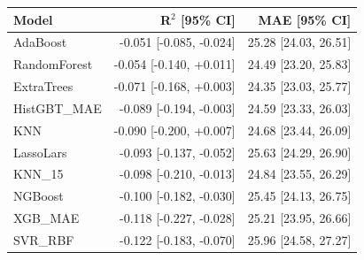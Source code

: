 \begin{tabular}{lrr}
\toprule
Model & R$^2$ [95\% CI] & MAE [95\% CI] \\
\midrule
AdaBoost & -0.051 [-0.085, -0.024] & 25.28 [24.03, 26.51] \\
RandomForest & -0.054 [-0.140, +0.011] & 24.49 [23.20, 25.83] \\
ExtraTrees & -0.071 [-0.168, +0.003] & 24.35 [23.03, 25.77] \\
HistGBT\_MAE & -0.089 [-0.194, -0.003] & 24.59 [23.33, 26.03] \\
KNN & -0.090 [-0.200, +0.007] & 24.68 [23.44, 26.09] \\
LassoLars & -0.093 [-0.137, -0.052] & 25.63 [24.29, 26.90] \\
KNN\_15 & -0.098 [-0.210, -0.013] & 24.84 [23.55, 26.29] \\
NGBoost & -0.100 [-0.182, -0.030] & 25.45 [24.13, 26.75] \\
XGB\_MAE & -0.118 [-0.227, -0.028] & 25.21 [23.95, 26.66] \\
SVR\_RBF & -0.122 [-0.183, -0.070] & 25.96 [24.58, 27.27] \\
\bottomrule
\end{tabular}